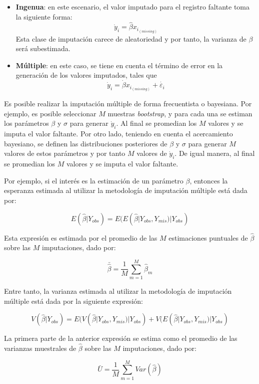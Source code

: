 \documentclass[
  12pt,
]{book}
\providecommand{\tightlist}{%
  \setlength{\itemsep}{0pt}\setlength{\parskip}{0pt}}
\begin{document}
\begin{itemize}
\tightlist
\item
  \textbf{Ingenua}: en este escenario, el valor imputado para el registro faltante toma la siguiente forma:
  \[
  \dot{y}_i = \hat\beta x_{i_{(missing)}}
  \]
  Esta clase de imputación carece de aleatoriedad y por tanto, la varianza de \(\beta\) será subestimada.
\item
  \textbf{Múltiple}: en este caso, se tiene en cuenta el término de error en la generación de los valores imputados, tales que
  \[
  \dot{y}_i = \dot{\beta} x_{i_{(missing)}}+ \dot{\varepsilon_i}
  \]
\end{itemize}

Es posible realizar la imputación múltiple de forma frecuentista o bayesiana. Por ejemplo, es posible seleccionar \(M\) muestras \emph{bootstrap}, y para cada una se estiman los parámetros \(\beta\) y \(\sigma\) para generar \(\dot{y}_i\). Al final se promedian los \(M\) valores y se imputa el valor faltante. Por otro lado, teniendo en cuenta el acercamiento bayesiano, se definen las distribuciones posteriores de \(\beta\) y \(\sigma\) para generar \(M\) valores de estos parámetros y por tanto \(M\) valores de \(\dot{y}_i\). De igual manera, al final se promedian los \(M\) valores y se imputa el valor faltante.

Por ejemplo, si el interés es la estimación de un parámetro \(\beta\), entonces la esperanza estimada al utilizar la metodología de imputación múltiple está dada por:

\[
E(\hat{\beta} | Y_{obs}) = E(E(\hat{\beta} | Y_{obs}, Y_{mis}) | Y_{obs})
\]

Esta expresión es estimada por el promedio de las \(M\) estimaciones puntuales de \(\hat{\beta}\) sobre las \(M\) imputaciones, dado por:

\[
\bar{\hat{\beta}} = \frac{1}{M} \sum_{m = 1} ^ M \hat{\beta}_m
\]

Entre tanto, la varianza estimada al utilizar la metodología de imputación múltiple está dada por la siguiente expresión:

\[
V(\hat{\beta} | Y_{obs}) = E(V(\hat{\beta} | Y_{obs}, Y_{mis}) | Y_{obs}) +
V(E(\hat{\beta} | Y_{obs}, Y_{mis}) | Y_{obs}) 
\]

La primera parte de la anterior expresión se estima como el promedio de las varianzas muestrales de \(\hat{\beta}\) sobre las \(M\) imputaciones, dado por:

\[
\bar{U} = \frac{1}{M} \sum_{m = 1} ^ M Var(\hat{\beta})
\]
\end{document}
